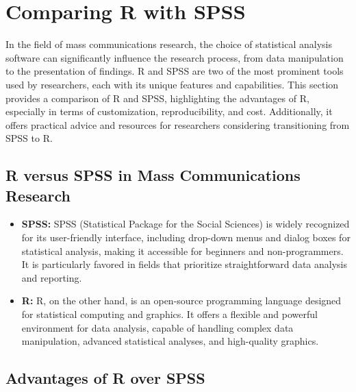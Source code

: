 \documentclass[
]{book}
\begin{document}
\hypertarget{comparing-r-with-spss}{%
\section{Comparing R with SPSS}\label{comparing-r-with-spss}}

In the field of mass communications research, the choice of statistical analysis software can significantly influence the research process, from data manipulation to the presentation of findings. R and SPSS are two of the most prominent tools used by researchers, each with its unique features and capabilities. This section provides a comparison of R and SPSS, highlighting the advantages of R, especially in terms of customization, reproducibility, and cost. Additionally, it offers practical advice and resources for researchers considering transitioning from SPSS to R.

\hypertarget{r-versus-spss-in-mass-communications-research}{%
\subsection*{R versus SPSS in Mass Communications Research}\label{r-versus-spss-in-mass-communications-research}}

\begin{itemize}
\item
  \textbf{SPSS:} SPSS (Statistical Package for the Social Sciences) is widely recognized for its user-friendly interface, including drop-down menus and dialog boxes for statistical analysis, making it accessible for beginners and non-programmers. It is particularly favored in fields that prioritize straightforward data analysis and reporting.
\item
  \textbf{R:} R, on the other hand, is an open-source programming language designed for statistical computing and graphics. It offers a flexible and powerful environment for data analysis, capable of handling complex data manipulation, advanced statistical analyses, and high-quality graphics.
\end{itemize}

\hypertarget{advantages-of-r-over-spss}{%
\subsection*{Advantages of R over SPSS}\label{advantages-of-r-over-spss}}
\end{document}
